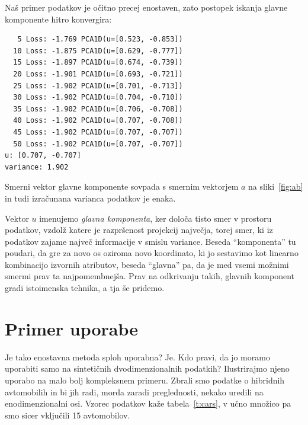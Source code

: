 Naš primer podatkov je očitno precej enostaven, zato postopek iskanja glavne komponente hitro konvergira:
%
\vspace*{3mm}
\begin{lstlisting}
   5 Loss: -1.769 PCA1D(u=[0.523, -0.853])
  10 Loss: -1.875 PCA1D(u=[0.629, -0.777])
  15 Loss: -1.897 PCA1D(u=[0.674, -0.739])
  20 Loss: -1.901 PCA1D(u=[0.693, -0.721])
  25 Loss: -1.902 PCA1D(u=[0.701, -0.713])
  30 Loss: -1.902 PCA1D(u=[0.704, -0.710])
  35 Loss: -1.902 PCA1D(u=[0.706, -0.708])
  40 Loss: -1.902 PCA1D(u=[0.707, -0.708])
  45 Loss: -1.902 PCA1D(u=[0.707, -0.707])
  50 Loss: -1.902 PCA1D(u=[0.707, -0.707])
u: [0.707, -0.707]
variance: 1.902
\end{lstlisting}
%
Smerni vektor glavne komponente sovpada s smernim vektorjem $a$ na sliki~\ref{fig:ab} in tudi izračunana varianca podatkov je enaka. 

Vektor $u$ imenujemo \emph{glavna komponenta}, ker določa tisto smer v prostoru podatkov, vzdolž katere je razpršenost projekcij največja, torej smer, ki iz podatkov zajame največ informacije v smislu variance. Beseda ``komponenta'' tu poudari, da gre za novo os oziroma novo koordinato, ki jo sestavimo kot linearno kombinacijo izvornih atributov, beseda ``glavna'' pa, da je med vsemi možnimi smermi prav ta najpomembnejša. Prav na odkrivanju takih, glavnih komponent gradi istoimenska tehnika, a tja še pridemo.

\section{Primer uporabe}

Je tako enostavna metoda sploh uporabna? Je. Kdo pravi, da jo moramo uporabiti samo na sintetičnih dvodimenzionalnih podatkih? Ilustrirajmo njeno uporabo na malo bolj kompleksnem primeru. Zbrali smo podatke o hibridnih avtomobilih in bi jih radi, morda zaradi preglednosti, nekako uredili na enodimenzionalni osi. Vzorec podatkov kaže tabela~\ref{t:cars}, v učno množico pa smo sicer vključili 15 avtomobilov.

